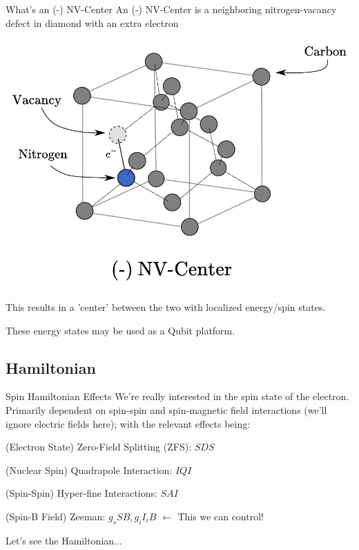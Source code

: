 \documentclass[11pt]{beamer}
\begin{document}
\begin{frame}{What's an (-) NV-Center}
An (-) NV-Center is a neighboring nitrogen-vacancy defect in diamond with an extra electron %

\begin{center}

\includegraphics[scale=0.43]{diamond_nv.pdf}

\end{center}\pause

This results in a 'center' between the two with localized energy/spin  states.\pause

\medskip

These energy states may be used as a Qubit platform.

\end{frame}
\subsection{Hamiltonian}
\begin{frame}{Spin Hamiltonian Effects}
We're really interested in the spin state of the electron. \pause
Primarily dependent on spin-spin and spin-magnetic field interactions (we'll ignore electric fields here); with the relevant effects being:

\vspace{.7cm}\pause

(Electron State) Zero-Field Splitting (ZFS): $SDS$

\vspace{.7cm}\pause

(Nuclear Spin) Quadrapole Interaction: $IQI$ 

\vspace{.7cm}\pause

(Spin-Spin) Hyper-fine Interactions:  $SAI$

\vspace{.7cm}\pause

(Spin-B Field) Zeeman: $g_sSB, g_iI_iB$ \pause $\leftarrow$ This we can control!

\medskip\pause

\begin{center}
Let's see the Hamiltonian...
\end{center}
\end{frame}
\end{document}
